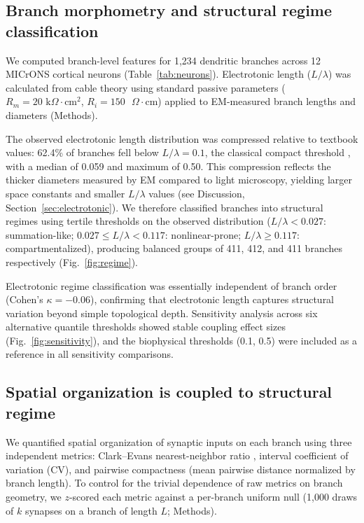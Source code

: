 \documentclass[11pt]{article}
\begin{document}
\subsection{Branch morphometry and structural regime classification}

We computed branch-level features for 1,234 dendritic branches across 12 MICrONS cortical neurons (Table~\ref{tab:neurons}). Electrotonic length ($L/\lambda$) was calculated from cable theory using standard passive parameters ($R_m = 20\text{ k}\Omega\cdot\text{cm}^2$, $R_i = 150\text{ }\Omega\cdot\text{cm}$) applied to EM-measured branch lengths and diameters (Methods).

The observed electrotonic length distribution was compressed relative to textbook values: 62.4\% of branches fell below $L/\lambda = 0.1$, the classical compact threshold \citep{rall1967}, with a median of 0.059 and maximum of 0.50. This compression reflects the thicker diameters measured by EM compared to light microscopy, yielding larger space constants and smaller $L/\lambda$ values (see Discussion, Section~\ref{sec:electrotonic}). We therefore classified branches into structural regimes using tertile thresholds on the observed distribution ($L/\lambda < 0.027$: summation-like; $0.027 \leq L/\lambda < 0.117$: nonlinear-prone; $L/\lambda \geq 0.117$: compartmentalized), producing balanced groups of 411, 412, and 411 branches respectively (Fig.~\ref{fig:regime}).

Electrotonic regime classification was essentially independent of branch order (Cohen's $\kappa = -0.06$), confirming that electrotonic length captures structural variation beyond simple topological depth. Sensitivity analysis across six alternative quantile thresholds showed stable coupling effect sizes (Fig.~\ref{fig:sensitivity}), and the biophysical thresholds (0.1, 0.5) were included as a reference in all sensitivity comparisons.

\subsection{Spatial organization is coupled to structural regime}

We quantified spatial organization of synaptic inputs on each branch using three independent metrics: Clark--Evans nearest-neighbor ratio \citep{clark1954}, interval coefficient of variation (CV), and pairwise compactness (mean pairwise distance normalized by branch length). To control for the trivial dependence of raw metrics on branch geometry, we $z$-scored each metric against a per-branch uniform null (1,000 draws of $k$ synapses on a branch of length $L$; Methods).
\end{document}
